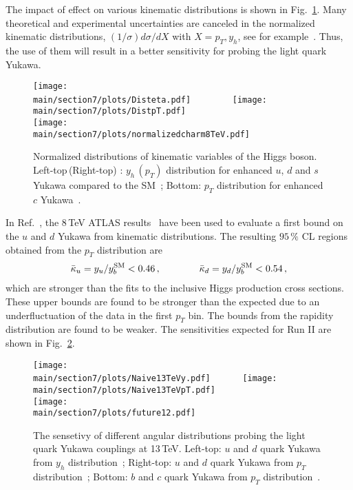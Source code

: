 \documentclass[../report.tex]{subfiles}
\providecommand{\main}{..}
\begin{document}
%
The impact of effect on various kinematic distributions is shown in Fig.~\ref{fig:HiggsDist}. 
Many theoretical and experimental uncertainties are canceled in  the normalized kinematic distributions, $(1/\sigma)d\sigma/dX$ with $X=p_T, y_h$, see for example~\cite{Soreq:2016rae}.
Thus, the use of them will result in a better sensitivity for probing the light quark Yukawa. 
\begin{figure}[t]
\begin{center}
\texttt{[image: \\main/section7/plots/Disteta.pdf]}~~~~~~~~
\texttt{[image: \\main/section7/plots/DistpT.pdf]}\\
\texttt{[image: \\main/section7/plots/normalizedcharm8TeV.pdf]}
\caption{Normalized distributions of kinematic variables of the Higgs boson. 
Left-top\,(Right-top) : $y_h\,(p_T)$ distribution for enhanced $u$, $d$ and $s$ Yukawa compared to the SM~\cite{Soreq:2016rae};
Bottom: $p_T$ distribution for enhanced $c$ Yukawa~\cite{Bishara:2016jga}. 
}
\label{fig:HiggsDist}
\end{center}
\end{figure}

In Ref.~\cite{Soreq:2016rae}, the 8\,TeV ATLAS results~\cite{Aad:2015lha} have been used to evaluate a first bound on the $u$ and $d$ Yukawa from kinematic distributions. The resulting $95\,\%$ CL regions obtained from the  $p_T$ distribution are
%
\begin{align}
	\bar{\kappa}_u = y_u/y^{\rm SM}_b < 0.46 \, , \qquad\qquad
	\bar{\kappa}_d = y_d/y^{\rm SM}_b< 0.54 \, ,
\end{align}
%
which are stronger than the fits to the inclusive Higgs production cross sections. 
These upper bounds are found to be stronger than the expected due to an underfluctuation of the data in the first $p_T$ bin. 
The bounds from the  rapidity distribution are found to be weaker. 
The sensitivities expected for Run II  are shown in Fig.~\ref{fig:HiggsDistFuture}. 
\begin{figure}[t]
\begin{center}
\texttt{[image: \\main/section7/plots/Naive13TeVy.pdf]}~~~~~~
\texttt{[image: \\main/section7/plots/Naive13TeVpT.pdf]}\\
\texttt{[image: \\main/section7/plots/future12.pdf]}
\caption{The sensetivy of  different angular distributions probing the light quark Yukawa couplings at 13\,TeV.  
Left-top: $u$ and $d$ quark Yukawa from $y_h$ distribution~\cite{Soreq:2016rae};
Right-top: $u$ and $d$ quark Yukawa from $p_T$ distribution~\cite{Soreq:2016rae}; 
Bottom: $b$ and $c$ quark Yukawa from $p_T$ distribution~\cite{Bishara:2016jga}. 
}
\label{fig:HiggsDistFuture}
\end{center}
\end{figure}
\end{document}
